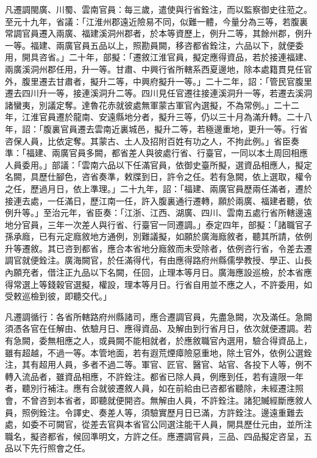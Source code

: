 \begin{pinyinscope}
 凡遷調閩廣、川蜀、雲南官員：每三歲，遣使與行省銓注，而以監察御史往蒞之。至元十九年，省議：「江淮州郡遠近險易不同，似難一體，今量分為三等，若腹裏常調官員遷入兩廣、福建溪洞州郡者，於本等資歷上，例升二等，其餘州郡，例升一等。福建、兩廣官員五品以上，照勘員闕，移咨都省銓注，六品以下，就便委用，開具咨省。」二十年，部擬：「遷敘江淮官員，擬定應得資品，若於接連福建、兩廣溪洞州郡任用，升一等。甘肅、中興行省所轄系西夏邊地，除本處籍貫見任官外，腹里遷去甘肅者，擬升二等，中興府擬升一等。」二十二年，詔：「管民官腹里遷去四川升一等，接連溪洞升二等。四川見任官遷往接連溪洞升一等，若遷去溪洞諸蠻夷，別議定奪。達魯花赤就彼處無軍蒙古軍官內選擬，不為常例。」二十二年，江淮官員遷於龍南、安遠縣地分者，擬升三等，仍以三十月為滿升轉。二十八年，詔：「腹裏官員遷去雲南近裏城邑，擬升二等，若極邊重地，更升一等。行省咨保人員，比依定奪。其蒙古、土人及招附百姓有功之人，不拘此例。」省臣奏準：「福建、兩廣官員多闕，都省差人與彼處行省、行臺官，一同以本土周回相應人員委用。」部議：「雲南六品以下任滿官員，依御史臺所擬，選資品相應人，擬定名闕，具歷仕腳色，咨省奏準，敕牒到日，許令之任。若有急闕，依上選取，權令之任，歷過月日，依上準理。」二十九年，詔：「福建、兩廣官員歷兩任滿者，遷於接連去處，一任滿日，歷江南一任，許入腹裏通行遷轉，願於兩廣、福建者聽，依例升等。」至治元年，省臣奏：「江浙、江西、湖廣、四川、雲南五處行省所轄邊遠地分官員，三年一次差人與行省、行臺官一同遷調。」泰定四年，部擬：「諸職官子孫承廕，已有元定廕敘地方通例，別難議擬，如願於廣海廕敘者，聽其所請，依例升等遷敘。其已咨到都省，應合本省地分廕敘而未受除者，依例咨行省，令差去遷調官就便銓注。廣海闕官，於任滿得代，有由應得路府州縣儒學教授、學正、山長內願充者，借注正九品以下名闕，任回，止理本等月日。廣海應設巡檢，於本省應得常選上等錢穀官選擬，權設，理本等月日。行省自用並不應之人，不許委用，如受敕巡檢到彼，即聽交代。」



 凡遷調循行：各省所轄路府州縣諸司，應合遷調官員，先盡急闕，次及滿任。急闕須憑各官在任解由、依驗月日、應得資品、及解由到行省月日，依次就便遷調。若有急闕，委無相應之人，或員闕不能相就者，於應敘職官內選用，驗合得資品上，雖有超越，不過一等。本管地面，若有遐荒煙瘴險惡重地，除土官外，依例公選銓注，其有超用人員，多者不過二等。軍官、匠官、醫官、站官、各投下人等，例不轉入流品者，雖資品相應，不許銓注。都省已除人員，例應到任，若有違限一年者，聽別行補注。應有合就彼遷敘人員，如在前給由已咨都省聽除，未經遷注照會，不曾咨到本省者，即聽就便開咨。無解由人員，不許銓注。諸犯贓經斷應敘人員，照例銓注。令譯史、奏差人等，須驗實歷月日已滿，方許銓注。邊遠重難去處，如委不可闕官，從差去官與本省官公同選注能干人員，開具歷仕元由，並所注職名，擬咨都省，候回準明文，方許之任。應遷調官員，三品、四品擬定咨呈，五品以下先行照會之任。




\end{pinyinscope}
